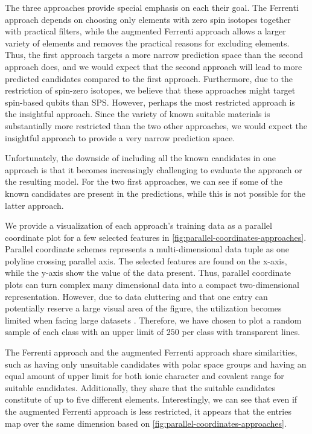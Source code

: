 The three approaches provide special emphasis on each their goal. The Ferrenti approach depends on choosing only elements with zero spin isotopes together with practical filters, while the augmented Ferrenti approach allows a larger variety of elements and removes the practical reasons for excluding elements. Thus, the first approach targets a more narrow prediction space than the second approach does, and we would expect that the second approach will lead to more predicted candidates compared to the first approach. Furthermore, due to the restriction of spin-zero isotopes, we believe that these approaches might target spin-based qubits than SPS.
However, perhaps the most restricted approach is the insightful approach. Since the variety of known suitable materials is substantially more restricted than the two other approaches, we would expect the insightful approach to provide a very narrow prediction space.


Unfortunately, the downside of including all the known candidates in one approach is that it becomes increasingly challenging to evaluate the approach or the resulting model. For the two first approaches, we can see if some of the known candidates are present in the predictions, while this is not possible for the latter approach.

We provide a visualization of each approach's training data as a parallel coordinate plot for a few selected features in \autoref{fig:parallel-coordinates-approaches}. Parallel coordinate schemes \cite{Inselberg1985, Inselberga1990} represents a multi-dimensional data tuple as one polyline crossing parallel axis. The selected features are found on the x-axis, while the y-axis show the value of the data present. Thus, parallel coordinate plots can turn complex many dimensional data into a compact two-dimensional representation. However, due to data cluttering and that one entry can potentially reserve a large visual area of the figure, the utilization becomes limited when facing large datasets \cite{Ericsona}. Therefore, we have chosen to plot a random sample of each class with an upper limit of $250$ per class with transparent lines.

The Ferrenti approach and the augmented Ferrenti approach share similarities, such as having only unsuitable candidates with polar space groups and having an equal amount of upper limit for both ionic character and covalent range for suitable candidates. Additionally, they share that the suitable candidates constitute of up to five different elements. Interestingly, we can see that even if the augmented Ferrenti approach is less restricted, it appears that the entries map over the same dimension based on \autoref{fig:parallel-coordinates-approaches}.

